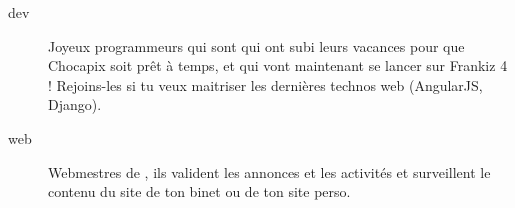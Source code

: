 \begin{description}
  

  \item[dev]{Joyeux programmeurs qui sont qui ont subi leurs vacances pour que Chocapix soit prêt à temps, et qui vont maintenant se lancer sur Frankiz 4 ! Rejoins-les si tu veux maitriser les dernières technos web (AngularJS, Django).}


  \item[web] {Webmestres de \fkz, ils valident les annonces et les activités et surveillent le contenu du site de ton binet ou de ton site perso.}









\end{description}

